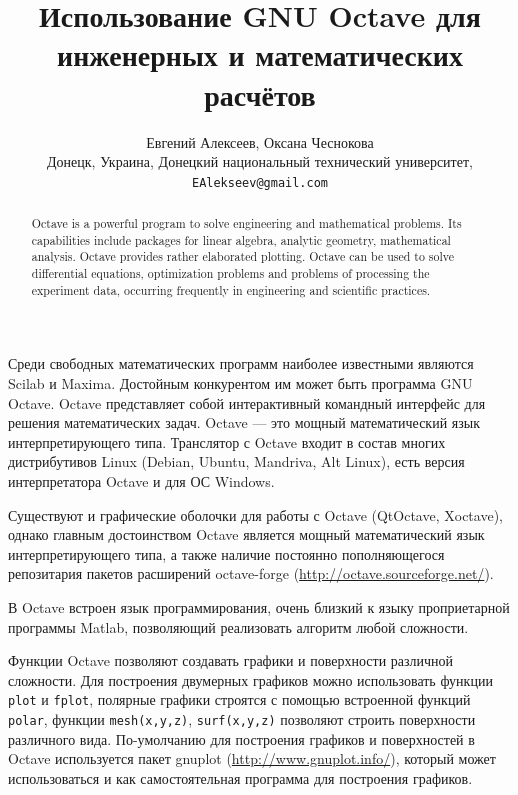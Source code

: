 \documentclass[10pt, a5paper]{article}
\begin{document}
\title{Использование GNU Octave для инженерных и математических расчётов}

\author{Евгений Алексеев, Оксана Чеснокова\\
\small Донецк, Украина, Донецкий национальный технический университет,\\ 
\small \texttt{EAlekseev@gmail.com}
}
\maketitle

\begin{abstract}
Octave is a powerful program to solve engineering and mathematical problems. Its capabilities include packages for linear algebra, analytic geometry, mathematical analysis. Octave provides rather elaborated plotting. Octave can be used to solve differential equations, optimization problems and problems of processing the experiment data, occurring frequently in engineering and scientific practices.
\end{abstract}

Среди свободных математических программ наиболее известными являются Scilab и Maxima. Достойным конкурентом им может быть программа GNU Octave. Octave представляет собой  интерактивный командный интерфейс для решения математических задач. Octave --- это мощный математический язык  интерпретирующего типа. Транслятор с Octave входит в состав многих дистрибутивов Linux (Debian, Ubuntu, Mandriva, Alt Linux), есть версия интерпретатора Octave и для ОС Windows.

Существуют и графические оболочки для работы с Octave (QtOctave, Xoctave), однако главным достоинством Octave является мощный математический язык интерпретирующего типа, а также наличие постоянно пополняющегося репозитария пакетов расширений octave-forge (\url{http://octave.sourceforge.net/}). 

В Octave встроен язык программирования, очень близкий к языку проприетарной программы Matlab, позволяющий  реализовать алгоритм любой сложности.

Функции Octave позволяют создавать графики и поверхности различной сложности. Для построения двумерных графиков можно использовать функции \verb!plot! и \verb!fplot!, полярные графики строятся с помощью встроенной функций \verb!polar!, функции \verb!mesh(x,y,z)!, \verb!surf(x,y,z)! позволяют строить поверхности различного вида. По-умолчанию для построения графиков и поверхностей в Octave используется пакет gnuplot (\url{http://www.gnuplot.info/}), который может использоваться и как самостоятельная программа для построения графиков.
\end{document}
